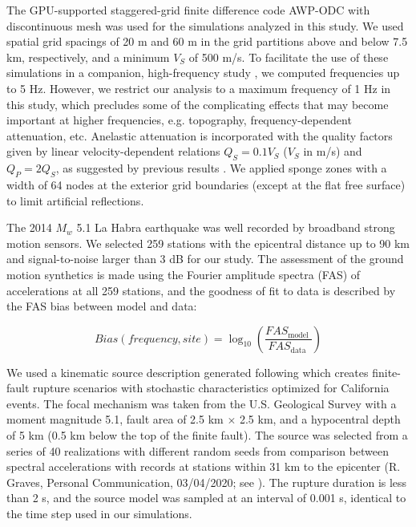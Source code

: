 The GPU-supported staggered-grid finite difference code AWP-ODC \citep[Anelastic Wave Propagation - Olsen, Day, and Cui, from the authors of the code;][]{cuiScalableEarthquakeSimulation2010} with discontinuous mesh \citep{nieFourthOrderStaggered2017} was used for the simulations analyzed in this study. We used spatial grid spacings of 20 m and 60 m in the grid partitions above and below 7.5 km, respectively, and a minimum $V_S$ of 500 m/s. To facilitate the use of these simulations in a companion, high-frequency study \citep{hu05HzDeterministic2021}, we computed frequencies up to 5 Hz. However, we restrict our analysis to a maximum frequency of 1 Hz in this study, which precludes some of the complicating effects that may become important at higher frequencies, e.g. topography, frequency-dependent attenuation, etc. 
Anelastic attenuation is incorporated with the quality factors given by linear velocity-dependent relations $Q_S=0.1V_S$ ($V_S$ in m/s) and $Q_P=2Q_S$, as suggested by previous results \citep{bielakShakeOutEarthquakeScenario2010,withersGroundMotionIntraevent2019}. We applied sponge zones \citep{cerjanNonreflectingBoundaryCondition1985} with a width of 64 nodes at the exterior grid boundaries (except at the flat free surface) to limit artificial reflections.

The 2014 $M_w$ 5.1 La Habra earthquake was well recorded by broadband strong motion sensors. We selected 259 stations with the epicentral distance up to 90 km and signal-to-noise larger than 3 dB for our study. The assessment of the ground motion synthetics is made using the Fourier amplitude spectra (FAS) of accelerations at all 259 stations, and the goodness of fit to data is described by the FAS bias between model and data:

\begin{equation}\label{eq:vs30-1}
  Bias(frequency, site)=\log_{10}\left(\frac{F A S_{\text {model }}}{F A S_{\text{data }}}\right)
\end{equation}

We used a kinematic source description generated following \citet{gravesKinematicGroundMotion2016} which creates finite-fault rupture scenarios with stochastic characteristics optimized for California events. The focal mechanism was taken from the U.S. Geological Survey \citep[strike=233$^\circ$, dip=77$^\circ$, rake=49$^\circ$;][]{usgsEarthquakeEventsFocal2014} with a moment magnitude 5.1, fault area of 2.5 km $\times$ 2.5 km, and a hypocentral depth of 5 km (0.5 km below the top of the finite fault). The source was selected from a series of 40 realizations with different random seeds from comparison between spectral accelerations with records at stations within 31 km to the epicenter (R. Graves, Personal Communication, 03/04/2020; see ). The rupture duration is less than 2 s, and the source model was sampled at an interval of 0.001 s, identical to the time step used in our simulations.

